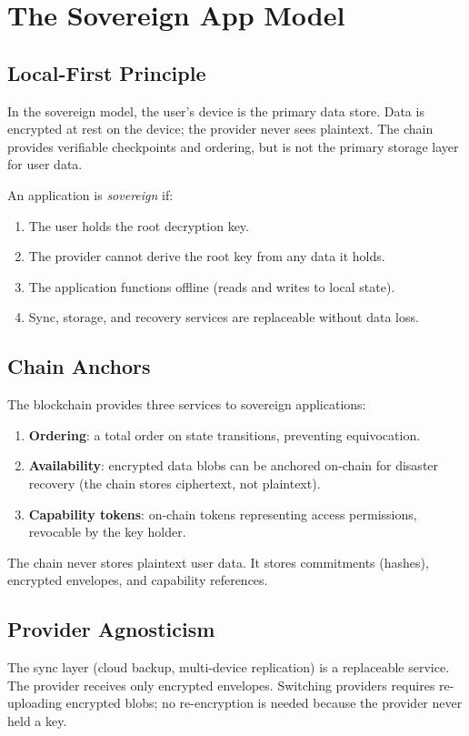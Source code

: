 \section{The Sovereign App Model}

\label{sec:model}

\subsection{Local-First Principle}

In the sovereign model, the user's device is the primary data store.  Data
is encrypted at rest on the device; the provider never sees plaintext.  The
chain provides verifiable checkpoints and ordering, but is not the primary
storage layer for user data.

\begin{definition}
An application is \emph{sovereign} if:
\begin{enumerate}[nosep]
  \item The user holds the root decryption key.
  \item The provider cannot derive the root key from any data it holds.
  \item The application functions offline (reads and writes to local state).
  \item Sync, storage, and recovery services are replaceable without data loss.
\end{enumerate}
\end{definition}

\subsection{Chain Anchors}

The blockchain provides three services to sovereign applications:
\begin{enumerate}[nosep]
  \item \textbf{Ordering}: a total order on state transitions, preventing
        equivocation.
  \item \textbf{Availability}: encrypted data blobs can be anchored on-chain
        for disaster recovery (the chain stores ciphertext, not plaintext).
  \item \textbf{Capability tokens}: on-chain tokens representing access
        permissions, revocable by the key holder.
\end{enumerate}

The chain never stores plaintext user data.  It stores commitments
(hashes), encrypted envelopes, and capability references.

\subsection{Provider Agnosticism}

The sync layer (cloud backup, multi-device replication) is a replaceable
service.  The provider receives only encrypted envelopes.  Switching
providers requires re-uploading encrypted blobs; no re-encryption is needed
because the provider never held a key.

